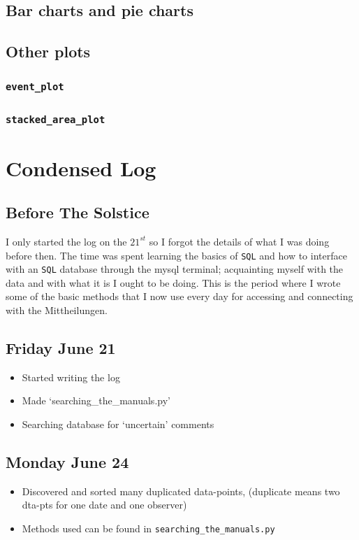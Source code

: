 \documentclass[12pt]{article}
\begin{document}
\subsection{Bar charts and pie charts}

\subsection{Other plots}
\subsubsection{\texttt{event\_plot}}

\subsubsection{\texttt{stacked\_area\_plot}}



\section{Condensed Log}

\subsection{Before The Solstice}
I only started the log on the $21^{st}$ so I forgot the details of what I was doing before then. The time was spent learning the basics of \texttt{SQL} and how to interface with an \texttt{SQL} database through the mysql terminal; acquainting myself with the data and with what it is I ought to be doing. This is the period where I wrote some of the basic methods that I now use every day for accessing and connecting with the Mittheilungen.

\subsection{Friday June 21}
\begin{itemize}
    \item Started writing the log
    \item Made `searching\_the\_manuals.py'
    \item Searching database for `uncertain' comments
\end{itemize}
    
\subsection{Monday June 24}
\begin{itemize}
    \item Discovered and sorted many duplicated data-points, (duplicate means two dta-pts for one date and one observer)
    \item Methods used can be found in \texttt{searching\_the\_manuals.py}
\end{itemize}
    
\end{document}
